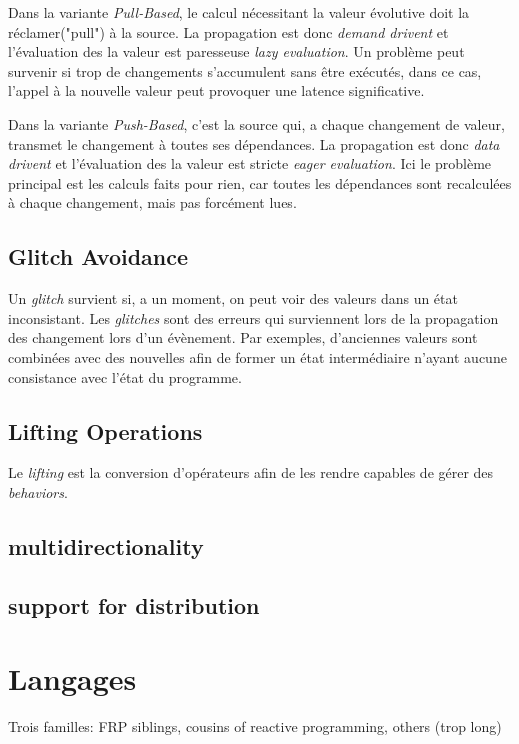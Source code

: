 \documentclass[10pt,final]{IEEEtran}
\begin{document}
Dans la variante \textit{Pull-Based}, le calcul nécessitant la valeur évolutive doit la réclamer("pull") à la source. La propagation est donc \textit{demand drivent} et l'évaluation des la valeur est paresseuse \textit{lazy evaluation}. Un problème peut survenir si trop de changements s'accumulent sans être exécutés, dans ce cas, l'appel à la nouvelle valeur peut provoquer une latence significative.

Dans la variante \textit{Push-Based}, c'est la source qui, a chaque changement de valeur, transmet le changement à toutes ses dépendances. La propagation est donc \textit{data drivent} et l'évaluation des la valeur est stricte \textit{eager evaluation}. Ici le problème principal est les calculs faits pour rien, car toutes les dépendances sont recalculées à chaque changement, mais pas forcément lues.

\subsection{Glitch Avoidance}
Un \textit{glitch} survient si, a un moment, on peut voir des valeurs dans un état inconsistant. Les \textit{glitches} sont des erreurs qui surviennent lors de la propagation des changement lors d'un évènement. Par exemples, d'anciennes valeurs sont combinées avec des nouvelles afin de former un état intermédiaire n'ayant aucune consistance avec l'état du programme.

\subsection{Lifting Operations}
Le \textit{lifting} est la conversion d'opérateurs afin de les rendre capables de gérer des \textit{behaviors}.

\subsection{multidirectionality}

\subsection{support for distribution}

\section{Langages}
Trois familles: FRP siblings, cousins of reactive programming, others (trop long)
\end{document}
